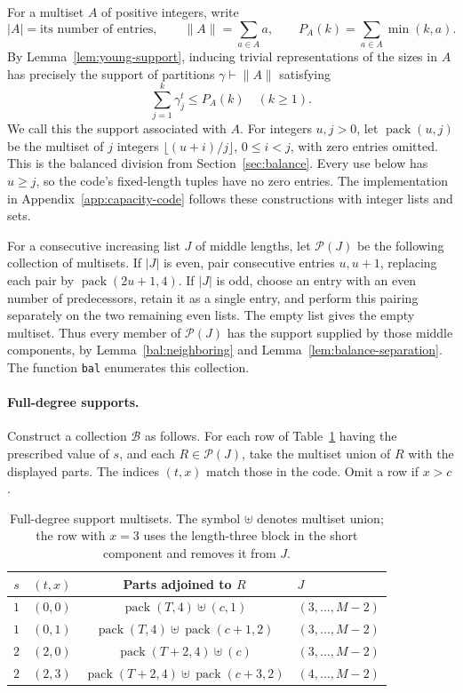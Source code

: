 For a multiset $A$ of positive integers, write
\[
 |A|=\text{its number of entries},\qquad
 \|A\|=\sum_{a\in A}a,\qquad
 P_A(k)=\sum_{a\in A}\min(k,a).
\]
By Lemma~\ref{lem:young-support}, inducing trivial representations of
the sizes in $A$ has precisely the support of partitions
$\gamma\vdash\|A\|$ satisfying
\begin{equation}
 \sum_{j=1}^k\gamma_j^t\le P_A(k)\quad(k\ge1).
 \label{eq:capacity-young}
\end{equation}
We call this the support associated with $A$. For integers $u,j>0$,
let $\operatorname{pack}(u,j)$ be the multiset of $j$ integers
$\lfloor(u+i)/j\rfloor$, $0\le i<j$, with zero entries omitted.
This is the balanced division from Section~\ref{sec:balance}.
Every use below has $u\ge j$, so the code's fixed-length tuples
have no zero entries. The implementation in
Appendix~\ref{app:capacity-code} follows these constructions with
integer lists and sets.

For a consecutive increasing list $J$ of middle lengths, let
$\mathcal P(J)$ be the following collection of multisets. If $|J|$
is even, pair consecutive entries $u,u+1$, replacing each pair by
$\operatorname{pack}(2u+1,4)$. If $|J|$ is odd, choose an entry with
an even number of predecessors, retain it as a single entry, and
perform this pairing separately on the two remaining even lists.
The empty list gives the empty multiset. Thus every member of
$\mathcal P(J)$ has the support supplied by those middle components,
by Lemma~\ref{bal:neighboring} and
Lemma~\ref{lem:balance-separation}. The function \texttt{bal}
enumerates this collection.

\paragraph{Full-degree supports.}
Construct a collection $\mathcal B$ as follows. For each row of
Table~\ref{tab:capacity-full-supports} having the prescribed value of
$s$, and each $R\in\mathcal P(J)$, take the multiset union of $R$
with the displayed parts. The indices $(t,x)$ match those in the code.
Omit a row if $x>c$.

\begin{table}[ht]
\centering
\small
\setlength{\tabcolsep}{5pt}
\begin{tabular}{@{}cccl@{}}
\hline
$s$ & $(t,x)$ & Parts adjoined to $R$ & $J$\\
\hline
$1$ & $(0,0)$ & $\operatorname{pack}(T,4)\uplus(c,1)$
    & $(3,\ldots,M-2)$\\
$1$ & $(0,1)$ & $\operatorname{pack}(T,4)\uplus\operatorname{pack}(c+1,2)$
    & $(3,\ldots,M-2)$\\
$2$ & $(2,0)$ & $\operatorname{pack}(T+2,4)\uplus(c)$
    & $(3,\ldots,M-2)$\\
$2$ & $(2,3)$ & $\operatorname{pack}(T+2,4)\uplus\operatorname{pack}(c+3,2)$
    & $(4,\ldots,M-2)$\\
\hline
\end{tabular}
\caption{Full-degree support multisets. The symbol $\uplus$ denotes
multiset union; the row with $x=3$ uses the length-three block in
the short component and removes it from $J$.}
\label{tab:capacity-full-supports}
\end{table}

